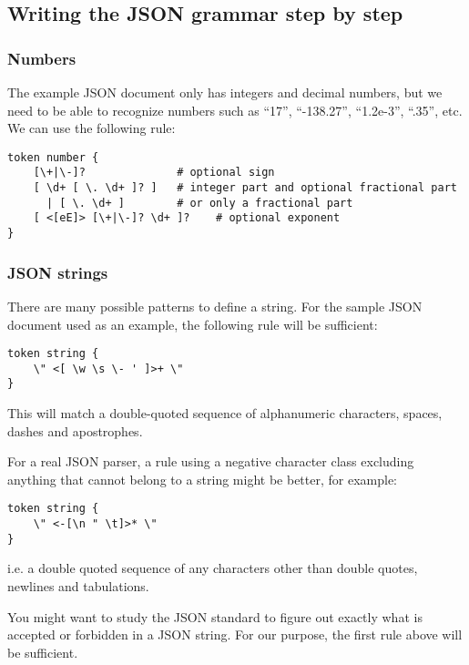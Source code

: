 \subsection{Writing the JSON grammar step by step}


\subsubsection{Numbers}

The example JSON document only has integers and decimal numbers, 
but we need to be able to recognize numbers such as ``17'', 
``-138.27'', ``1.2e-3'', ``.35'', etc. We can use the following rule:

\begin{verbatim}
token number {
    [\+|\-]?              # optional sign
    [ \d+ [ \. \d+ ]? ]   # integer part and optional fractional part
      | [ \. \d+ ]        # or only a fractional part
    [ <[eE]> [\+|\-]? \d+ ]?    # optional exponent
}
\end{verbatim}

\subsubsection{JSON strings}

There are many possible patterns to define a string. For 
the sample JSON document used as an example, the following 
rule will be sufficient:

\begin{verbatim}
token string {
    \" <[ \w \s \- ' ]>+ \" 
}
\end{verbatim}

This will match a double-quoted sequence of alphanumeric 
characters, spaces, dashes and apostrophes.

For a real JSON parser, a rule using a negative character 
class excluding anything that cannot belong to a string 
might be better, for example:

\begin{verbatim}
token string {
    \" <-[\n " \t]>* \"
}
\end{verbatim}

i.e. a double quoted sequence of any characters other than 
double quotes, newlines and tabulations.

You might want to study the JSON standard to figure out 
exactly what is accepted or forbidden in a JSON string. 
For our purpose, the first rule above will be sufficient.

